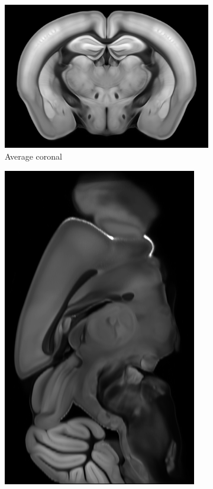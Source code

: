 \documentclass[]{article}
\begin{document}
\begin{figure}
	\begin{subfigure}{.43\textwidth}
		\centering
		\includegraphics[width=.9\linewidth]{figures/avgt_coronal.png}
		\caption{Average coronal}
		\label{fig:average_cor}
	\end{subfigure}
	\begin{subfigure}{.3\textwidth}
		\centering
		\includegraphics[width=.9\linewidth, angle=270]{figures/avgt_sagittal.png}

\end{subfigure}
\end{figure}
\end{document}
